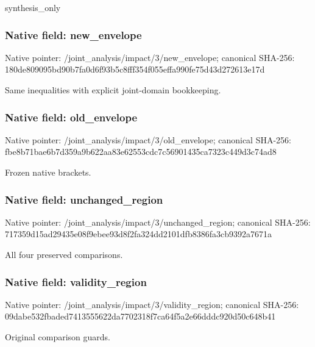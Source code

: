 \documentclass[10pt,a4paper]{article}
\begin{document}
\begingroup\raggedright\sloppy synthesis\_\allowbreak{}only\par\endgroup

\subsubsection{Native field: new\_\allowbreak{}envelope}
Native pointer: /joint\_\allowbreak{}analysis/impact/3/new\_\allowbreak{}envelope; canonical SHA-256: 180de809095bd90b7fa0d6f93b5c8fff354f055effa990fe75d43d272613e17d

\begingroup\raggedright\sloppy Same inequalities with explicit joint-domain bookkeeping.\par\endgroup

\subsubsection{Native field: old\_\allowbreak{}envelope}
Native pointer: /joint\_\allowbreak{}analysis/impact/3/old\_\allowbreak{}envelope; canonical SHA-256: fbe8b71bae6b7d359a9b622aa83e62553cdc7c56901435ca7323c449d3c74ad8

\begingroup\raggedright\sloppy Frozen native brackets.\par\endgroup

\subsubsection{Native field: unchanged\_\allowbreak{}region}
Native pointer: /joint\_\allowbreak{}analysis/impact/3/unchanged\_\allowbreak{}region; canonical SHA-256: 717359d15ad29435e08f9ebee93d8f2fa324dd2101dfb8386fa3cb9392a7671a

\begingroup\raggedright\sloppy All four preserved comparisons.\par\endgroup

\subsubsection{Native field: validity\_\allowbreak{}region}
Native pointer: /joint\_\allowbreak{}analysis/impact/3/validity\_\allowbreak{}region; canonical SHA-256: 09dabe532fbaded7413555622da7702318f7ca64f5a2e66dddc920d50c648b41

\begingroup\raggedright\sloppy Original comparison guards.\par\endgroup
\end{document}

